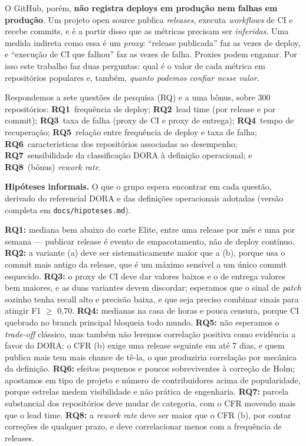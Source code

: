 \documentclass[12pt]{article}
\begin{document}
O GitHub, porém, \textbf{não registra deploys em produção nem falhas em
produção}. Um projeto open source publica \emph{releases}, executa
\emph{workflows} de CI e recebe commits, e é a partir disso que as métricas
precisam ser \emph{inferidas}. Uma medida indireta como essa é um \emph{proxy}:
``release publicada'' faz as vezes de deploy, e ``execução de CI que falhou''
faz as vezes de falha. Proxies podem enganar. Por isso este trabalho faz duas
perguntas: qual é o valor de cada métrica em repositórios populares e, também,
\emph{quanto podemos confiar nesse valor}.

Respondemos a sete questões de pesquisa (RQ) e a uma bônus, sobre 300
repositórios:
\textbf{RQ1}~frequência de deploy;
\textbf{RQ2}~lead time (por release e por commit);
\textbf{RQ3}~taxa de falha (proxy de CI e proxy de entrega);
\textbf{RQ4}~tempo de recuperação;
\textbf{RQ5}~relação entre frequência de deploy e taxa de falha;
\textbf{RQ6}~características dos repositórios associadas ao desempenho;
\textbf{RQ7}~sensibilidade da classificação DORA à definição operacional;
e \textbf{RQ8}~(bônus) \emph{rework rate}.

\textbf{Hipóteses informais.} O que o grupo espera encontrar em cada questão,
derivado do referencial DORA e das definições operacionais adotadas (versão
completa em \texttt{docs/hipoteses.md}).

\textbf{RQ1:} mediana bem abaixo do corte Elite, entre uma release por mês e
uma por semana --- publicar release é evento de empacotamento, não de deploy
contínuo. \textbf{RQ2:} a variante (a) deve ser sistematicamente maior que a
(b), porque usa o commit mais antigo da release, que é um máximo sensível a um
único commit esquecido. \textbf{RQ3:} o proxy de CI deve dar valores baixos e o
de entrega valores bem maiores, e as duas variantes devem discordar; esperamos
que o sinal de \emph{patch} sozinho tenha recall alto e precisão baixa, e que
seja preciso combinar sinais para atingir F1 $\ge$ 0,70. \textbf{RQ4:} medianas
na casa de horas e pouca censura, porque CI quebrado no branch principal
bloqueia todo mundo. \textbf{RQ5:} não esperamos o \emph{trade-off} clássico,
mas também não leremos correlação positiva como evidência a favor do DORA: o
CFR (b) exige uma release seguinte em até 7 dias, e quem publica mais tem mais
chance de tê-la, o que produziria correlação por mecânica da definição.
\textbf{RQ6:} efeitos pequenos e poucos sobreviventes à correção de Holm;
apostamos em tipo de projeto e número de contribuidores acima de popularidade,
porque estrelas medem visibilidade e não prática de engenharia. \textbf{RQ7:}
parcela substancial dos repositórios deve mudar de categoria, com o CFR movendo
mais que o lead time. \textbf{RQ8:} a \emph{rework rate} deve ser maior que o
CFR (b), por contar correções de qualquer prazo, e deve correlacionar menos com
a frequência de releases.
\end{document}
